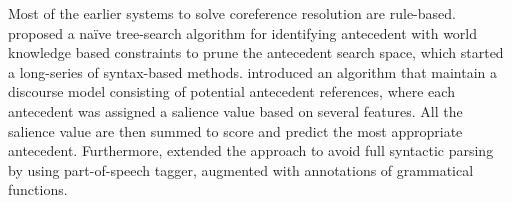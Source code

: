 \documentclass[11pt]{article}
\begin{document}



Most of the earlier systems to solve coreference resolution are rule-based. \parencite{hobbs1978} proposed a naïve tree-search algorithm for identifying antecedent with world knowledge based constraints to prune the antecedent search space, which started a long-series of syntax-based methods. \parencite{lappin1994} introduced an algorithm that maintain a discourse model consisting of potential antecedent references, where each antecedent was assigned a salience value based on several features. All the salience value are then summed to score and predict the most appropriate antecedent. Furthermore, \parencite{kennedy1996} extended the approach to avoid full syntactic parsing by using part-of-speech tagger, augmented with annotations of grammatical functions.
\end{document}
